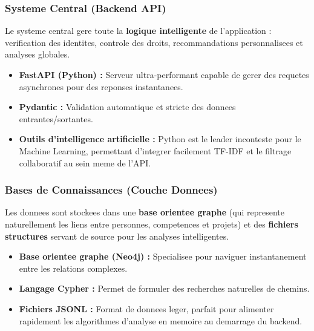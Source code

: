 \documentclass[12pt,a4paper]{article}
\begin{document}
\subsubsection{Systeme Central (Backend API)}

Le systeme central gere toute la \textbf{logique intelligente} de l'application : verification des identites, controle des droits, recommandations personnalisees et analyses globales.

\begin{tcolorbox}[colback=bleu!5,colframe=bleu,title=Justification des choix techniques]
\begin{itemize}[leftmargin=*]
    \item \textbf{FastAPI (Python) :} Serveur ultra-performant capable de gerer des requetes asynchrones pour des reponses instantanees.
    \item \textbf{Pydantic :} Validation automatique et stricte des donnees entrantes/sortantes.
    \item \textbf{Outils d'intelligence artificielle :} Python est le leader inconteste pour le Machine Learning, permettant d'integrer facilement TF-IDF et le filtrage collaboratif au sein meme de l'API.
\end{itemize}
\end{tcolorbox}

\subsubsection{Bases de Connaissances (Couche Donnees)}

Les donnees sont stockees dans une \textbf{base orientee graphe} (qui represente naturellement les liens entre personnes, competences et projets) et des \textbf{fichiers structures} servant de source pour les analyses intelligentes.

\begin{tcolorbox}[colback=bleu!5,colframe=bleu,title=Justification des choix techniques]
\begin{itemize}[leftmargin=*]
    \item \textbf{Base orientee graphe (Neo4j) :} Specialisee pour naviguer instantanement entre les relations complexes.
    \item \textbf{Langage Cypher :} Permet de formuler des recherches naturelles de chemins.
    \item \textbf{Fichiers JSONL :} Format de donnees leger, parfait pour alimenter rapidement les algorithmes d'analyse en memoire au demarrage du backend.
\end{itemize}
\end{tcolorbox}
\end{document}
